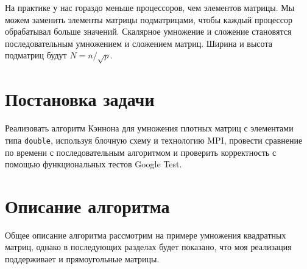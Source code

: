 \documentclass[12pt]{article}
\begin{document}
 На практике у нас гораздо меньше процессоров, чем элементов матрицы. Мы можем заменить элементы матрицы подматрицами, чтобы каждый процессор обрабатывал больше значений. Скалярное умножение и сложение становятся последовательным умножением и сложением матриц. Ширина и высота подматриц будут $N = n / \sqrt{p}$.

\section{Постановка задачи}

\hspace*{1.25em} Реализовать алгоритм Кэннона для умножения плотных матриц с элементами типа \texttt{double}, используя блочную схему и технологию MPI, провести сравнение по времени с последовательным алгоритмом и проверить корректность с помощью функциональных тестов Google Test.

\section{Описание алгоритма}

\hspace*{1.25em}Общее описание алгоритма рассмотрим на примере умножения квадратных матриц, однако в последующих разделах будет показано, что моя реализация поддерживает и прямоугольные матрицы.
\end{document}
